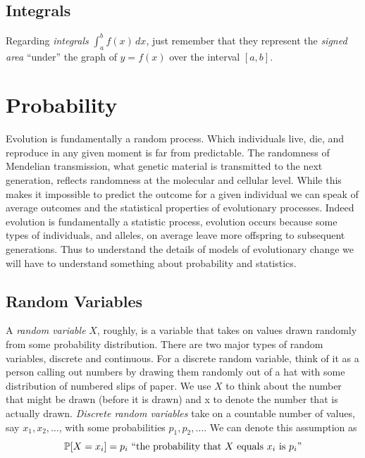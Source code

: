 \subsection{Integrals} Regarding  \emph{integrals} $\int_a^b f(x)\,dx$, just remember that
they represent the \emph{signed area} ``under'' the graph of $y=f(x)$
over the interval $[a,b]$. %

\section{Probability}
Evolution is fundamentally a random process. Which individuals live,
die, and reproduce in any given moment is far from predictable. The randomness of Mendelian transmission, what genetic material
is transmitted to the next generation, reflects randomness at the
molecular and cellular level. While this makes it impossible to
predict the outcome for a given individual we can speak of average
outcomes and the statistical properties of evolutionary
processes. Indeed evolution is fundamentally a statistic process,
evolution occurs because some types of individuals, and alleles, on
average leave more offspring to subsequent generations. Thus to
understand the details of models of evolutionary change we will have to understand something
about probability and statistics. 

\subsection{Random Variables} \label{Section_rv}

A  \emph{random variable} $X$, roughly,
is a variable that takes on values drawn randomly from some
probability distribution.  There are two major types of random
variables, discrete and continuous.  For a discrete random variable, think of it as a person calling out numbers
by drawing them randomly out of a hat with some distribution of
numbered slips of paper. We use $X$ to think about the number that might be drawn (before it is drawn) and x to denote the number that is actually drawn.
\emph{Discrete random variables} take on a countable number of values, say $x_1,x_2,\dots$, with some probabilities $p_1,p_2,\dots$. We can denote this assumption as 
\[
\P[X=x_i]=p_i \mbox{ ``the probability that $X$ equals $x_i$ is $p_i$''}
\]

